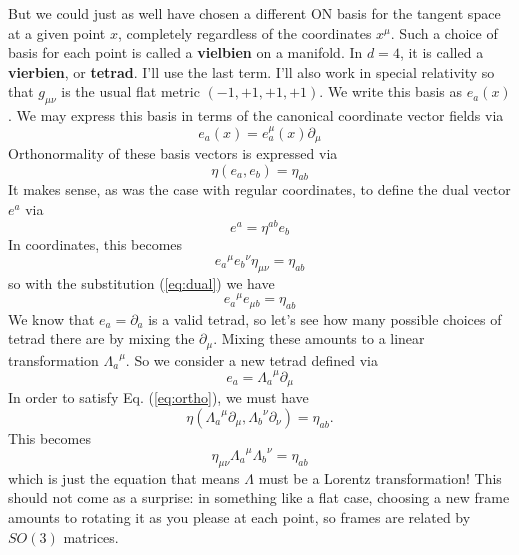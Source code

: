 \documentclass[main.tex]{subfiles}
\begin{document}
But we could just as well have chosen a different ON basis for the tangent space at a given point $x$, completely regardless of the coordinates $x^\mu$. Such a choice of basis for each point is called a \textbf{vielbien} on a manifold. In $d = 4$, it is called a \textbf{vierbien}, or \textbf{tetrad}. I'll use the last term. I'll also work in special relativity so that $g_{\mu \nu}$ is the usual flat metric $(-1,+1,+1,+1)$. We write this basis as $e_a(x)$. We may express this basis in terms of the canonical coordinate vector fields via
\begin{equation} \label{eq:tetrad}
e_a (x) = e_a^{\mu} (x) \partial_\mu
\end{equation}
Orthonormality of these basis vectors is expressed via
\begin{equation} \label{eq:ortho}
\eta(e_a,e_b) = \eta_{ab}
\end{equation}
It makes sense, as was the case with regular coordinates, to define the dual vector $e^a$ via
\begin{equation} \label{eq:dual}
e^a = \eta^{ab} e_b
\end{equation}
In coordinates, this becomes
\[
{e_a}^\mu {e_b}^\nu \eta_{\mu \nu} = \eta_{ab}
\]
so with the substitution (\ref{eq:dual}) we have
\begin{equation}
{e_a}^\mu e_{\mu b}  = \eta_{ab}
\end{equation}
We know that $e_a = \partial_a$ is a valid tetrad, so let's see how many possible choices of tetrad there are by mixing the $\partial_\mu$. Mixing these amounts to a linear transformation ${\Lambda_a}^\mu$. So we consider a new tetrad defined via
\[
e_a = {\Lambda_a}^\mu \partial_\mu
\]
In order to satisfy Eq. (\ref{eq:ortho}), we must have
\[
\eta ({\Lambda_a}^\mu \partial_\mu, {\Lambda_b}^\nu \partial_\nu) = \eta_{ab}.
\]
This becomes
\[
\eta_{\mu \nu} {\Lambda_a}^\mu {\Lambda_b}^\nu = \eta_{ab}
\]
which is just the equation that means $\Lambda$ must be a Lorentz transformation! This should not come as a surprise: in something like a flat case, choosing a new frame amounts to rotating it as you please at each point, so frames are related by $SO(3)$ matrices.
\end{document}
